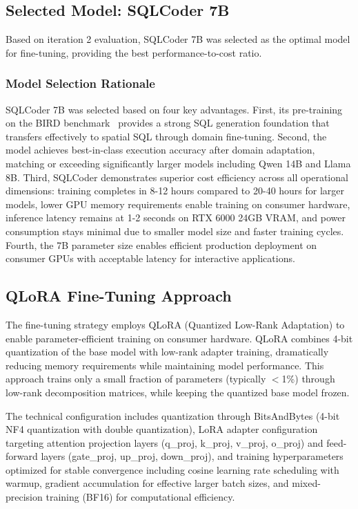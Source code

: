 \subsection{Selected Model: SQLCoder 7B}

Based on iteration 2 evaluation, SQLCoder 7B was selected as the optimal model for fine-tuning, providing the best performance-to-cost ratio.

\subsubsection{Model Selection Rationale}

SQLCoder 7B was selected based on four key advantages. First, its pre-training on the BIRD benchmark~\cite{bird-bench} provides a strong SQL generation foundation that transfers effectively to spatial SQL through domain fine-tuning. Second, the model achieves best-in-class execution accuracy after domain adaptation, matching or exceeding significantly larger models including Qwen 14B and Llama 8B. Third, SQLCoder demonstrates superior cost efficiency across all operational dimensions: training completes in 8-12 hours compared to 20-40 hours for larger models, lower GPU memory requirements enable training on consumer hardware, inference latency remains at 1-2 seconds on RTX 6000 24GB VRAM, and power consumption stays minimal due to smaller model size and faster training cycles. Fourth, the 7B parameter size enables efficient production deployment on consumer GPUs with acceptable latency for interactive applications.

\subsection{QLoRA Fine-Tuning Approach}

The fine-tuning strategy employs QLoRA (Quantized Low-Rank Adaptation) to enable parameter-efficient training on consumer hardware. QLoRA combines 4-bit quantization of the base model with low-rank adapter training, dramatically reducing memory requirements while maintaining model performance. This approach trains only a small fraction of parameters (typically $<$1\%) through low-rank decomposition matrices, while keeping the quantized base model frozen.

The technical configuration includes quantization through BitsAndBytes (4-bit NF4 quantization with double quantization), LoRA adapter configuration targeting attention projection layers (q\_proj, k\_proj, v\_proj, o\_proj) and feed-forward layers (gate\_proj, up\_proj, down\_proj), and training hyperparameters optimized for stable convergence including cosine learning rate scheduling with warmup, gradient accumulation for effective larger batch sizes, and mixed-precision training (BF16) for computational efficiency.

